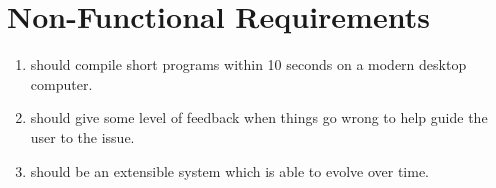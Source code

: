 \section{Non-Functional Requirements}

\begin{enumerate}
    \item \rimp should compile short programs within 10 seconds on a modern desktop computer.
    \item \rimp should give some level of feedback when things go wrong to help guide the user to the issue.
    \item \rimp should be an extensible system which is able to evolve over time.
\end{enumerate}

